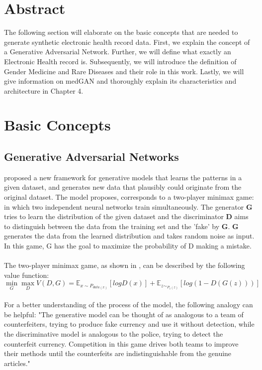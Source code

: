 \documentclass[11pt, a4paper, oneside]{book}
\begin{document}
\section{Abstract}
The following section will elaborate on the basic concepts that are needed to  generate synthetic electronic health record data.
First, we explain the concept of a Generative Adversarial Network. Further, we will define what exactly an Electronic Health record is. Subsequently, we will introduce the definition of Gender Medicine and Rare Diseases and their role in this work. Lastly, we will give information on medGAN and thoroughly explain its characteristics and architecture in Chapter 4.

\section{Basic Concepts}
\subsection{Generative Adversarial Networks}
\citep{Goodfellow2014} proposed a new framework for generative models that learns the patterns in a given dataset, and generates new data that plausibly could originate from the original dataset.
 The model \citep{Goodfellow2014} proposes, corresponds to a two-player minimax game: in which two independent neural networks train simultaneously. The generator \textbf{G} tries to learn the distribution of the given dataset and the discriminator \textbf{D} aims to distinguish between the data from the training set and the 'fake' by \textbf{G}. \textbf{G} generates the data from the learned distribution and takes random noise as input. In this game, G has the goal to maximize the probability of D making a mistake.  
\\
\\
The two-player minimax game, as shown in \citep{Goodfellow2014}, can be described by the following value function:
\\
\begin{equation}
	\min_G\max_DV(D,G) = \mathbb{E}_{x\sim{P_{data(x)}}}[log D(x)] + \mathbb{E}_{z\sim_{P_z(z)}}[log(1 - D(G(z)))]
\end{equation}
\\

For a better understanding of the process of the model, the following analogy can be helpful:
"The generative model can be thought of as analogous to a team of counterfeiters, trying  to  produce  fake  currency  and  use  it  without  detection,  while  the  discriminative  model  is analogous to the police, trying to detect the counterfeit currency.  Competition in this game drives both teams to improve their methods until the counterfeits are indistinguishable from the genuine articles." \citep{Goodfellow2014}
\end{document}
